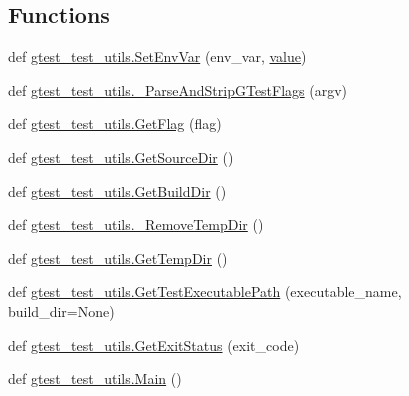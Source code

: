 \subsection*{Functions}
\begin{DoxyCompactItemize}
\item 
def \mbox{\hyperlink{namespacegtest__test__utils_a616ee0f04e98e54b128cbe492def9bb1}{gtest\+\_\+test\+\_\+utils.\+Set\+Env\+Var}} (env\+\_\+var, \mbox{\hyperlink{_obj__test_2lib_2googletest-master_2googlemock_2test_2gmock-matchers__test_8cc_a337b8a670efc0b086ad3af163f3121b6}{value}})
\item 
def \mbox{\hyperlink{namespacegtest__test__utils_a05ad62af6574fd7e4fa2cc7c952c4f0b}{gtest\+\_\+test\+\_\+utils.\+\_\+\+Parse\+And\+Strip\+G\+Test\+Flags}} (argv)
\item 
def \mbox{\hyperlink{namespacegtest__test__utils_a052da74a5e39162480daf3a4d8eff9a6}{gtest\+\_\+test\+\_\+utils.\+Get\+Flag}} (flag)
\item 
def \mbox{\hyperlink{namespacegtest__test__utils_aaff66cb0980804d8bd57dc719d4b5518}{gtest\+\_\+test\+\_\+utils.\+Get\+Source\+Dir}} ()
\item 
def \mbox{\hyperlink{namespacegtest__test__utils_a1eacd9a471dfa6133028923ea755d22c}{gtest\+\_\+test\+\_\+utils.\+Get\+Build\+Dir}} ()
\item 
def \mbox{\hyperlink{namespacegtest__test__utils_a2fcd62f625111800ee67e0afe46b2c75}{gtest\+\_\+test\+\_\+utils.\+\_\+\+Remove\+Temp\+Dir}} ()
\item 
def \mbox{\hyperlink{namespacegtest__test__utils_a25987e1cd76e93068b2afe6bac909d12}{gtest\+\_\+test\+\_\+utils.\+Get\+Temp\+Dir}} ()
\item 
def \mbox{\hyperlink{namespacegtest__test__utils_a89ed3717984a80ffbb7a9c92f71b86a2}{gtest\+\_\+test\+\_\+utils.\+Get\+Test\+Executable\+Path}} (executable\+\_\+name, build\+\_\+dir=None)
\item 
def \mbox{\hyperlink{namespacegtest__test__utils_acf8280de4dc027a28ffc9de43f245b50}{gtest\+\_\+test\+\_\+utils.\+Get\+Exit\+Status}} (exit\+\_\+code)
\item 
def \mbox{\hyperlink{namespacegtest__test__utils_a5361b42d9c6843b5b117ead4d1c58cc5}{gtest\+\_\+test\+\_\+utils.\+Main}} ()
\end{DoxyCompactItemize}
